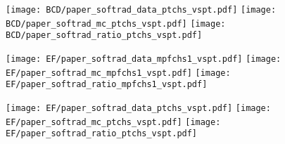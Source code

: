 \documentclass[landscape,10pt]{beamer} %
\newcommand{\commentout}[1]{}
\begin{document}
\begin{figure}[p]
\centering
  \texttt{[image: BCD/paper\_softrad\_data\_ptchs\_vspt.pdf]}
  \texttt{[image: BCD/paper\_softrad\_mc\_ptchs\_vspt.pdf]}
  \texttt{[image: BCD/paper\_softrad\_ratio\_ptchs\_vspt.pdf]}
\end{figure}

\newpage

\begin{figure}[p]
\centering
  \texttt{[image: EF/paper\_softrad\_data\_mpfchs1\_vspt.pdf]}
  \texttt{[image: EF/paper\_softrad\_mc\_mpfchs1\_vspt.pdf]}
  \texttt{[image: EF/paper\_softrad\_ratio\_mpfchs1\_vspt.pdf]}
\end{figure}

\begin{figure}[p]
\centering
  \texttt{[image: EF/paper\_softrad\_data\_ptchs\_vspt.pdf]}
  \texttt{[image: EF/paper\_softrad\_mc\_ptchs\_vspt.pdf]}
  \texttt{[image: EF/paper\_softrad\_ratio\_ptchs\_vspt.pdf]}
\end{figure}

\commentout{
\newpage

\begin{figure}[p]
\centering
  \texttt{[image: BCDEFGH/paper\_softrad\_data\_mpfchs1\_vspt.pdf]}
  \texttt{[image: BCDEFGH/paper\_softrad\_mc\_mpfchs1\_vspt.pdf]}
  \texttt{[image: BCDEFGH/paper\_softrad\_ratio\_mpfchs1\_vspt.pdf]}
\end{figure}

\begin{figure}[p]
\centering
  \texttt{[image: BCDEFGH/paper\_softrad\_data\_ptchs\_vspt.pdf]}
  \texttt{[image: BCDEFGH/paper\_softrad\_mc\_ptchs\_vspt.pdf]}
  \texttt{[image: BCDEFGH/paper\_softrad\_ratio\_ptchs\_vspt.pdf]}
\end{figure}
} %


\newpage
\commentout{
\begin{figure}[p]
\centering
  \texttt{[image: L4/paper\_softrad\_data\_mpfchs1\_vspt.pdf]}
  \texttt{[image: L4/paper\_softrad\_mc\_mpfchs1\_vspt.pdf]}
  \texttt{[image: L4/paper\_softrad\_ratio\_mpfchs1\_vspt.pdf]}
\end{figure}

\begin{figure}[p]
\centering
  \texttt{[image: L4/paper\_softrad\_data\_ptchs\_vspt.pdf]}
  \texttt{[image: L4/paper\_softrad\_mc\_ptchs\_vspt.pdf]}
  \texttt{[image: L4/paper\_softrad\_ratio\_ptchs\_vspt.pdf]}
\end{figure}
} %
\end{document}
